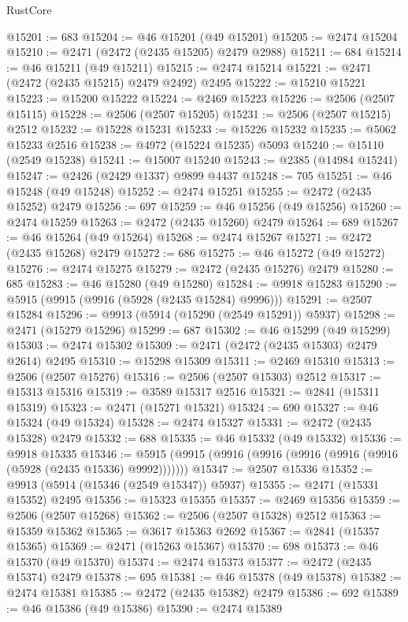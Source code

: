 \begin{lexlean}{RustCore}
\begin{coremodule}
@15201 := 683
@15204 := @46 @15201 (@49 @15201)
@15205 := @2474 @15204
@15210 := @2471 (@2472 (@2435 @15205) @2479 @2988)
@15211 := 684
@15214 := @46 @15211 (@49 @15211)
@15215 := @2474 @15214
@15221 := @2471 (@2472 (@2435 @15215) @2479 @2492) @2495
@15222 := @15210 @15221
@15223 := @15200 @15222
@15224 := @2469 @15223
@15226 := @2506 (@2507 @15115)
@15228 := @2506 (@2507 @15205)
@15231 := @2506 (@2507 @15215) @2512
@15232 := @15228 @15231
@15233 := @15226 @15232
@15235 := @5062 @15233 @2516
@15238 := @4972 (@15224 @15235) @5093
@15240 := @15110 (@2549 @15238)
@15241 := @15007 @15240
@15243 := @2385 (@14984 @15241)
@15247 := @2426 (@2429 @1337) @9899 @4437
@15248 := 705
@15251 := @46 @15248 (@49 @15248)
@15252 := @2474 @15251
@15255 := @2472 (@2435 @15252) @2479
@15256 := 697
@15259 := @46 @15256 (@49 @15256)
@15260 := @2474 @15259
@15263 := @2472 (@2435 @15260) @2479
@15264 := 689
@15267 := @46 @15264 (@49 @15264)
@15268 := @2474 @15267
@15271 := @2472 (@2435 @15268) @2479
@15272 := 686
@15275 := @46 @15272 (@49 @15272)
@15276 := @2474 @15275
@15279 := @2472 (@2435 @15276) @2479
@15280 := 685
@15283 := @46 @15280 (@49 @15280)
@15284 := @9918 @15283
@15290 := @5915 (@9915 (@9916 (@5928 (@2435 @15284) @9996)))
@15291 := @2507 @15284
@15296 := @9913 (@5914 (@15290 (@2549 @15291)) @5937)
@15298 := @2471 (@15279 @15296)
@15299 := 687
@15302 := @46 @15299 (@49 @15299)
@15303 := @2474 @15302
@15309 := @2471 (@2472 (@2435 @15303) @2479 @2614) @2495
@15310 := @15298 @15309
@15311 := @2469 @15310
@15313 := @2506 (@2507 @15276)
@15316 := @2506 (@2507 @15303) @2512
@15317 := @15313 @15316
@15319 := @3589 @15317 @2516
@15321 := @2841 (@15311 @15319)
@15323 := @2471 (@15271 @15321)
@15324 := 690
@15327 := @46 @15324 (@49 @15324)
@15328 := @2474 @15327
@15331 := @2472 (@2435 @15328) @2479
@15332 := 688
@15335 := @46 @15332 (@49 @15332)
@15336 := @9918 @15335
@15346 := @5915 (@9915 (@9916 (@9916 (@9916 (@9916 (@9916 (@5928 (@2435 @15336) @9992)))))))
@15347 := @2507 @15336
@15352 := @9913 (@5914 (@15346 (@2549 @15347)) @5937)
@15355 := @2471 (@15331 @15352) @2495
@15356 := @15323 @15355
@15357 := @2469 @15356
@15359 := @2506 (@2507 @15268)
@15362 := @2506 (@2507 @15328) @2512
@15363 := @15359 @15362
@15365 := @3617 @15363 @2692
@15367 := @2841 (@15357 @15365)
@15369 := @2471 (@15263 @15367)
@15370 := 698
@15373 := @46 @15370 (@49 @15370)
@15374 := @2474 @15373
@15377 := @2472 (@2435 @15374) @2479
@15378 := 695
@15381 := @46 @15378 (@49 @15378)
@15382 := @2474 @15381
@15385 := @2472 (@2435 @15382) @2479
@15386 := 692
@15389 := @46 @15386 (@49 @15386)
@15390 := @2474 @15389

\end{coremodule}
\end{lexlean}
